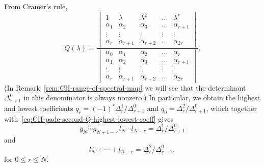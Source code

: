 \documentclass[10pt,a4paper]{article} \pdfoutput=1 
\begin{document}
From Cramer's rule,
\begin{equation}
  \label{eq:CH-Qn-odd-det}
  Q(\lambda) =
  \frac{
    \begin{vmatrix}
      1 & \lambda & \lambda^2 & \dots & \lambda^r \\
      \alpha_1 & \alpha_2 & \alpha_3 & \dots & \alpha_{r+1} \\
      \vdots & \vdots & \vdots & \vdots & \vdots \\
      \alpha_{r} & \alpha_{r+1} & \alpha_{r+2} & \dots & \alpha_{2r}
    \end{vmatrix}
  }{
    \begin{vmatrix}
      \alpha_0 & \alpha_1 & \alpha_2 & \dots & \alpha_r \\
      \alpha_1 & \alpha_2 & \alpha_3 & \dots & \alpha_{r+1} \\
      \vdots & \vdots & \vdots & \vdots & \vdots \\
      \alpha_{r} & \alpha_{r+1} & \alpha_{r+2} & \dots & \alpha_{2r}
    \end{vmatrix}
  }
  .
\end{equation}
(In Remark~\ref{rem:CH-range-of-spectral-map}
we will see that the determinant $\Delta_{r+1}^0$
in this denominator is always nonzero.)
In particular, we obtain the highest and lowest coefficients
$q_r = (-1)^r \Delta_r^1 / \Delta_{r+1}^0$
and
$q_0 = \Delta_r^2 / \Delta_{r+1}^0$,
which together with~\eqref{eq:CH-pade-second-Q-highest-lowest-coeff} gives
\begin{equation}
  \label{eq:CH-string-inverse-second-determinant-quotient}
    g_{N} \dotsm g_{N+1-r} \, l_{N} \dotsm l_{N-r}
    = \Delta_r^1 / \Delta_{r+1}^0
\end{equation}
and
\begin{equation}
  \label{eq:CH-string-inverse-third-determinant-quotient}
  l_N + \dotsb + l_{N-r}
  = \Delta_r^2 / \Delta_{r+1}^0
  ,
\end{equation}
for $0 \le r \le N$.
\end{document}
